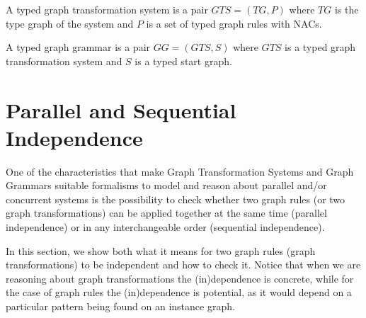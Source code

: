 \begin{definition} A typed graph transformation system is a pair $GTS = \left(TG,P\right)$ where $TG$ is the type graph of the system and $P$ is a set of typed graph rules with NACs.

  A typed graph grammar is a pair $GG = \left(GTS,S\right)$ where $GTS$ is a typed graph transformation system and $S$ is a typed start graph.
\end{definition}

\section{Parallel and Sequential Independence}

One of the characteristics that make Graph Transformation Systems and Graph Grammars suitable formalisms to model and reason about parallel and/or concurrent systems is the possibility to check whether two graph rules (or two graph transformations) can be applied together at the same time (parallel independence) or in any interchangeable order (sequential independence).

In this section, we show both what it means for two graph rules (graph transformations) to be independent and how to check it. Notice that when we are reasoning about graph transformations the (in)dependence is concrete, while for the case of graph rules the (in)dependence is potential, as it would depend on a particular pattern being found on an instance graph.

